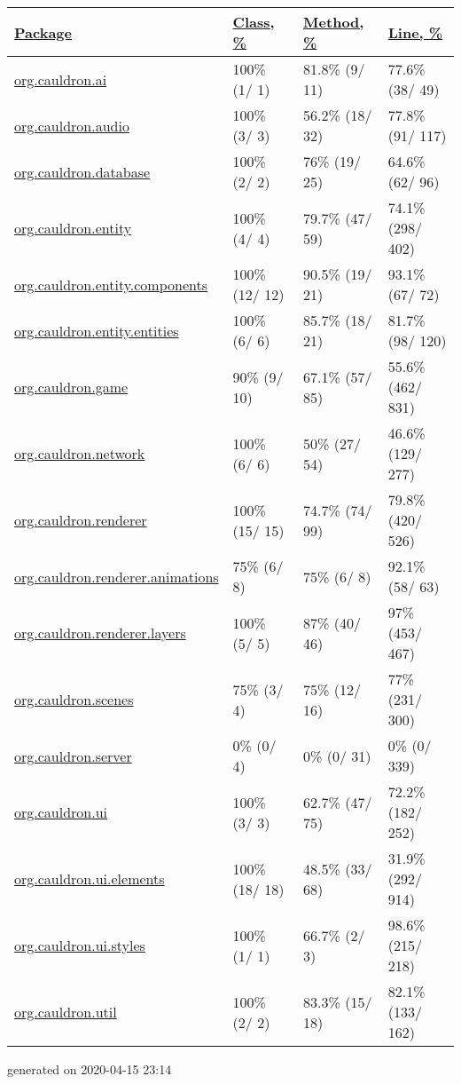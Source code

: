 \documentclass[
]{article}
\begin{document}
\begin{longtable}[]{@{}llll@{}}
\toprule
\href{index_SORT_BY_NAME_DESC.html}{Package} &
\href{index_SORT_BY_CLASS.html}{Class, \%} &
\href{index_SORT_BY_METHOD.html}{Method, \%} &
\href{index_SORT_BY_LINE.html}{Line, \%}\tabularnewline
\midrule
\endhead
\href{org.cauldron.ai/index.html}{org.cauldron.ai} & { 100\% } { (1/ 1)
} & { 81.8\% } { (9/ 11) } & { 77.6\% } { (38/ 49) }\tabularnewline
\href{org.cauldron.audio/index.html}{org.cauldron.audio} & { 100\% } {
(3/ 3) } & { 56.2\% } { (18/ 32) } & { 77.8\% } { (91/ 117)
}\tabularnewline
\href{org.cauldron.database/index.html}{org.cauldron.database} & { 100\%
} { (2/ 2) } & { 76\% } { (19/ 25) } & { 64.6\% } { (62/ 96)
}\tabularnewline
\href{org.cauldron.entity/index.html}{org.cauldron.entity} & { 100\% } {
(4/ 4) } & { 79.7\% } { (47/ 59) } & { 74.1\% } { (298/ 402)
}\tabularnewline
\href{org.cauldron.entity.components/index.html}{org.cauldron.entity.components}
& { 100\% } { (12/ 12) } & { 90.5\% } { (19/ 21) } & { 93.1\% } { (67/
72) }\tabularnewline
\href{org.cauldron.entity.entities/index.html}{org.cauldron.entity.entities}
& { 100\% } { (6/ 6) } & { 85.7\% } { (18/ 21) } & { 81.7\% } { (98/
120) }\tabularnewline
\href{org.cauldron.game/index.html}{org.cauldron.game} & { 90\% } { (9/
10) } & { 67.1\% } { (57/ 85) } & { 55.6\% } { (462/ 831)
}\tabularnewline
\href{org.cauldron.network/index.html}{org.cauldron.network} & { 100\% }
{ (6/ 6) } & { 50\% } { (27/ 54) } & { 46.6\% } { (129/ 277)
}\tabularnewline
\href{org.cauldron.renderer/index.html}{org.cauldron.renderer} & { 100\%
} { (15/ 15) } & { 74.7\% } { (74/ 99) } & { 79.8\% } { (420/ 526)
}\tabularnewline
\href{org.cauldron.renderer.animations/index.html}{org.cauldron.renderer.animations}
& { 75\% } { (6/ 8) } & { 75\% } { (6/ 8) } & { 92.1\% } { (58/ 63)
}\tabularnewline
\href{org.cauldron.renderer.layers/index.html}{org.cauldron.renderer.layers}
& { 100\% } { (5/ 5) } & { 87\% } { (40/ 46) } & { 97\% } { (453/ 467)
}\tabularnewline
\href{org.cauldron.scenes/index.html}{org.cauldron.scenes} & { 75\% } {
(3/ 4) } & { 75\% } { (12/ 16) } & { 77\% } { (231/ 300)
}\tabularnewline
\href{org.cauldron.server/index.html}{org.cauldron.server} & { 0\% } {
(0/ 4) } & { 0\% } { (0/ 31) } & { 0\% } { (0/ 339) }\tabularnewline
\href{org.cauldron.ui/index.html}{org.cauldron.ui} & { 100\% } { (3/ 3)
} & { 62.7\% } { (47/ 75) } & { 72.2\% } { (182/ 252) }\tabularnewline
\href{org.cauldron.ui.elements/index.html}{org.cauldron.ui.elements} & {
100\% } { (18/ 18) } & { 48.5\% } { (33/ 68) } & { 31.9\% } { (292/ 914)
}\tabularnewline
\href{org.cauldron.ui.styles/index.html}{org.cauldron.ui.styles} & {
100\% } { (1/ 1) } & { 66.7\% } { (2/ 3) } & { 98.6\% } { (215/ 218)
}\tabularnewline
\href{org.cauldron.util/index.html}{org.cauldron.util} & { 100\% } { (2/
2) } & { 83.3\% } { (15/ 18) } & { 82.1\% } { (133/ 162)
}\tabularnewline
\bottomrule
\end{longtable}

generated on 2020-04-15 23:14
\end{document}
